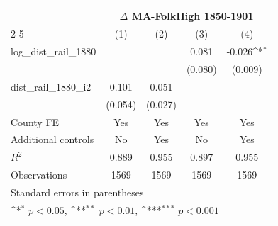 {
\def\sym#1{\ifmmode^{#1}\else\(^{#1}\)\fi}
\begin{tabular}{l*{4}{c}}
\toprule
                &\multicolumn{4}{c}{$\Delta$ MA-FolkHigh 1850-1901}                         \\\cmidrule(lr){2-5}
                &\multicolumn{1}{c}{(1)}         &\multicolumn{1}{c}{(2)}         &\multicolumn{1}{c}{(3)}         &\multicolumn{1}{c}{(4)}         \\
\midrule
log\_dist\_rail\_1880&                  &                  &    0.081         &   -0.026\sym{*}  \\
                &                  &                  &  (0.080)         &  (0.009)         \\
dist\_rail\_1880\_i2&    0.101         &    0.051         &                  &                  \\
                &  (0.054)         &  (0.027)         &                  &                  \\
County FE       &      Yes         &      Yes         &      Yes         &      Yes         \\
Additional controls &       No         &      Yes         &       No         &      Yes         \\
\midrule
\(R^{2}\)       &    0.889         &    0.955         &    0.897         &    0.955         \\
Observations    &     1569         &     1569         &     1569         &     1569         \\
\bottomrule
\multicolumn{5}{l}{\footnotesize Standard errors in parentheses}\\
\multicolumn{5}{l}{\footnotesize \sym{*} \(p<0.05\), \sym{**} \(p<0.01\), \sym{***} \(p<0.001\)}\\
\end{tabular}
}

